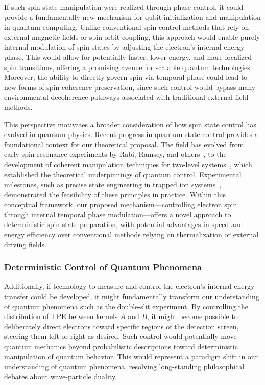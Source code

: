 \documentclass[%
 reprint,
 amsmath,amssymb,
 aps,
]{revtex4-1}
\numberwithin{equation}{section}%
\begin{document}
If such spin state manipulation were realized through phase control, it could provide a fundamentally new mechanism for qubit initialization and manipulation in quantum computing. Unlike conventional spin control methods that rely on external magnetic fields or spin-orbit coupling, this approach would enable purely internal modulation of spin states by adjusting the electron’s internal energy phase. This would allow for potentially faster, lower-energy, and more localized spin transitions, offering a promising avenue for scalable quantum technologies. Moreover, the ability to directly govern spin via temporal phase could lead to new forms of spin coherence preservation, since such control would bypass many environmental decoherence pathways associated with traditional external-field methods.

This perspective motivates a broader consideration of how spin state control has evolved in quantum physics. Recent progress in quantum state control provides a foundational context for our theoretical proposal. The field has evolved from early spin resonance experiments by Rabi, Ramsey, and others~\cite{rabi1937}, to the development of coherent manipulation techniques for two-level systems~\cite{allen1975}, which established the theoretical underpinnings of quantum control. Experimental milestones, such as precise state engineering in trapped ion systems~\cite{monroe1995}, demonstrated the feasibility of these principles in practice. Within this conceptual framework, our proposed mechanism—controlling electron spin through internal temporal phase modulation—offers a novel approach to deterministic spin state preparation, with potential advantages in speed and energy efficiency over conventional methods relying on thermalization or external driving fields.

\subsubsection{Deterministic Control of Quantum Phenomena}
Additionally, if technology to measure and control the electron's internal energy transfer could be developed, it might fundamentally transform our understanding of quantum phenomena such as the double-slit experiment. By controlling the distribution of TPE between kernels $A$ and $B$, it might become possible to deliberately direct electrons toward specific regions of the detection screen, steering them left or right as desired. Such control would potentially move quantum mechanics beyond probabilistic descriptions toward deterministic manipulation of quantum behavior. This would represent a paradigm shift in our understanding of quantum phenomena, resolving long-standing philosophical debates about wave-particle duality.
\end{document}

